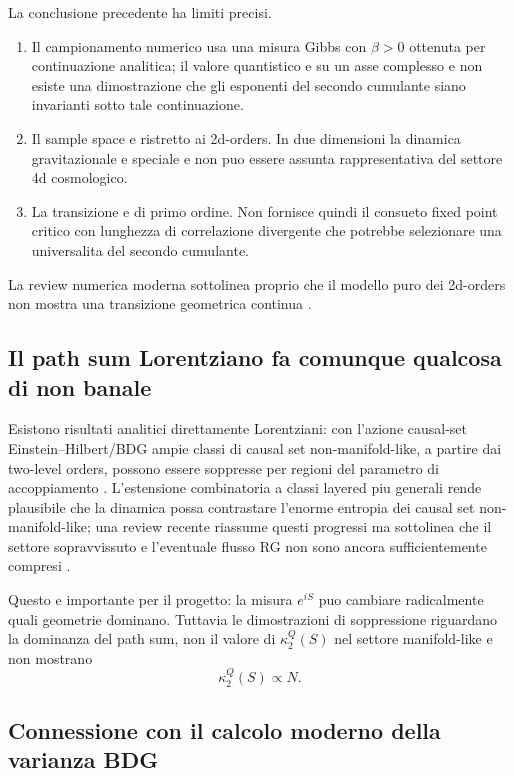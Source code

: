 \documentclass[11pt,a4paper]{article}
\begin{document}
La conclusione precedente ha limiti precisi.
\begin{enumerate}
\item Il campionamento numerico usa una misura Gibbs con $\beta>0$ ottenuta per continuazione analitica; il valore quantistico e su un asse complesso e non esiste una dimostrazione che gli esponenti del secondo cumulante siano invarianti sotto tale continuazione.
\item Il sample space e ristretto ai 2d-orders. In due dimensioni la dinamica gravitazionale e speciale e non puo essere assunta rappresentativa del settore 4d cosmologico.
\item La transizione e di primo ordine. Non fornisce quindi il consueto fixed point critico con lunghezza di correlazione divergente che potrebbe selezionare una universalita del secondo cumulante.
\end{enumerate}
La review numerica moderna sottolinea proprio che il modello puro dei 2d-orders non mostra una transizione geometrica continua \cite{Glaser2024Simulations}.

\subsection{Il path sum Lorentziano fa comunque qualcosa di non banale}

Esistono risultati analitici direttamente Lorentziani: con l'azione causal-set Einstein--Hilbert/BDG ampie classi di causal set non-manifold-like, a partire dai two-level orders, possono essere soppresse per regioni del parametro di accoppiamento \cite{LoomisCarlip2018}. L'estensione combinatoria a classi layered piu generali rende plausibile che la dinamica possa contrastare l'enorme entropia dei causal set non-manifold-like; una review recente riassume questi progressi ma sottolinea che il settore sopravvissuto e l'eventuale flusso RG non sono ancora sufficientemente compresi \cite{Carlip2024}.

Questo e importante per il progetto: la misura $e^{iS}$ puo cambiare radicalmente quali geometrie dominano. Tuttavia le dimostrazioni di soppressione riguardano la dominanza del path sum, non il valore di $\kappa_2^{Q}(S)$ nel settore manifold-like e non mostrano
\begin{equation}
\kappa_2^{Q}(S)\propto N.
\end{equation}

\subsection{Connessione con il calcolo moderno della varianza BDG}
\end{document}
